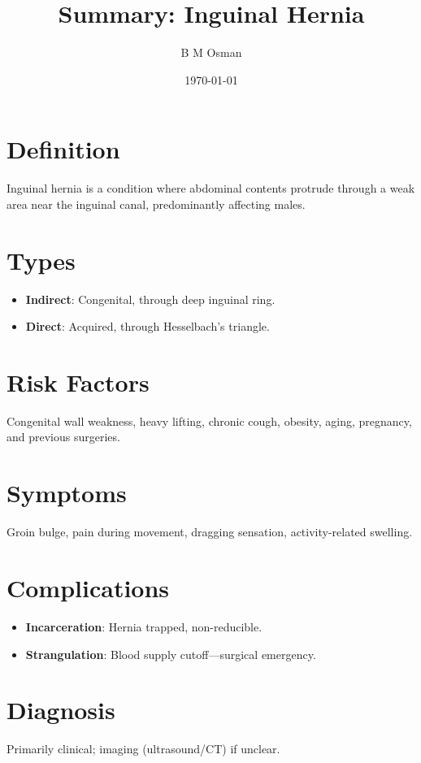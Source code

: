 \documentclass{article}
\title{Summary: Inguinal Hernia}
\author{B M Osman}
\date{\today}
\begin{document}
\maketitle

\section*{Definition}
Inguinal hernia is a condition where abdominal contents protrude through a weak area near the inguinal canal, predominantly affecting males.

\section*{Types}
\begin{itemize}[noitemsep]
  \item \textbf{Indirect}: Congenital, through deep inguinal ring.
  \item \textbf{Direct}: Acquired, through Hesselbach’s triangle.
\end{itemize}

\section*{Risk Factors}
Congenital wall weakness, heavy lifting, chronic cough, obesity, aging, pregnancy, and previous surgeries.

\section*{Symptoms}
Groin bulge, pain during movement, dragging sensation, activity-related swelling.

\section*{Complications}
\begin{itemize}[noitemsep]
  \item \textbf{Incarceration}: Hernia trapped, non-reducible.
  \item \textbf{Strangulation}: Blood supply cutoff—surgical emergency.
\end{itemize}

\section*{Diagnosis}
Primarily clinical; imaging (ultrasound/CT) if unclear.
\end{document}
